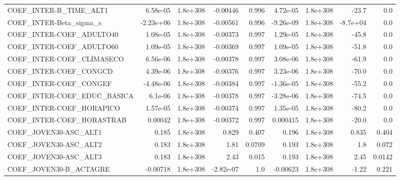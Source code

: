 \begin{tabular}{lrrrrrrrr}
COEF\_INTER-B\_TIME\_ALT1            &    6.58e-05 &     1.8e+308 &  -0.00446 &    0.996 &   4.72e-05 &    1.8e+308 &        -23.7 &           0.0 \\
COEF\_INTER-Beta\_sigma\_s           &   -2.23e+06 &     1.8e+308 &  -0.00561 &    0.996 &  -9.26e-09 &    1.8e+308 &     -8.7e+04 &           0.0 \\
COEF\_INTER-COEF\_ADULTO40          &    1.08e-05 &     1.8e+308 &  -0.00373 &    0.997 &   1.29e-05 &    1.8e+308 &        -45.8 &           0.0 \\
COEF\_INTER-COEF\_ADULTO60          &    1.09e-05 &     1.8e+308 &  -0.00369 &    0.997 &   1.09e-05 &    1.8e+308 &        -51.8 &           0.0 \\
COEF\_INTER-COEF\_CLIMASECO         &    6.56e-06 &     1.8e+308 &  -0.00378 &    0.997 &   3.08e-06 &    1.8e+308 &        -61.9 &           0.0 \\
COEF\_INTER-COEF\_CONGCD            &    4.39e-06 &     1.8e+308 &  -0.00376 &    0.997 &   3.23e-06 &    1.8e+308 &        -70.0 &           0.0 \\
COEF\_INTER-COEF\_CONGEF            &   -4.48e-06 &     1.8e+308 &  -0.00384 &    0.997 &  -1.36e-05 &    1.8e+308 &        -55.2 &           0.0 \\
COEF\_INTER-COEF\_EDUC\_BASICA       &     6.1e-06 &     1.8e+308 &  -0.00378 &    0.997 &  -3.28e-06 &    1.8e+308 &        -74.5 &           0.0 \\
COEF\_INTER-COEF\_HORAPICO          &    1.57e-05 &     1.8e+308 &  -0.00374 &    0.997 &   1.35e-05 &    1.8e+308 &        -80.2 &           0.0 \\
COEF\_INTER-COEF\_HORASTRAB         &     0.00042 &     1.8e+308 &  -0.00372 &    0.997 &   0.000415 &    1.8e+308 &        -20.0 &           0.0 \\
COEF\_JOVEN30-ASC\_ALT1             &       0.185 &     1.8e+308 &     0.829 &    0.407 &      0.196 &    1.8e+308 &        0.835 &         0.404 \\
COEF\_JOVEN30-ASC\_ALT2             &       0.183 &     1.8e+308 &      1.81 &   0.0709 &      0.193 &    1.8e+308 &          1.8 &         0.072 \\
COEF\_JOVEN30-ASC\_ALT3             &       0.183 &     1.8e+308 &      2.43 &    0.015 &      0.193 &    1.8e+308 &         2.45 &        0.0142 \\
COEF\_JOVEN30-B\_ACTAGRE            &    -0.00718 &     1.8e+308 & -2.82e-07 &      1.0 &   -0.00623 &    1.8e+308 &        -1.22 &         0.221 \\

\end{tabular}
